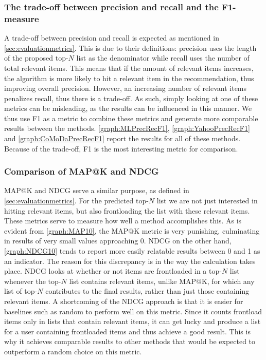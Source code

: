 \subsubsection{The trade-off between precision and recall and the F1-measure}\label{subsub:precrectradeoff}
A trade-off between precision and recall is expected as mentioned in \autoref{sec:evaluationmetrics}.
This is due to their definitions: precision uses the length of the proposed top-$N$ list as the denominator while recall uses the number of total relevant items.
This means that if the amount of relevant items increases, the algorithm is more likely to hit a relevant item in the recommendation, thus improving overall precision.
However, an increasing number of relevant items penalizes recall, thus there is a trade-off.
As such, simply looking at one of these metrics can be misleading, as the results can be influenced in this manner.
We thus use F1 as a metric to combine these metrics and generate more comparable results between the methods.
\autoref{graph:MLPrecRecF1}, \autoref{graph:YahooPrecRecF1} and \autoref{graph:CoMoDaPrecRecF1} report the results for all of these methods.
Because of the trade-off, F1 is the most interesting metric for comparison.


\subsubsection{Comparison of MAP@K and NDCG}
MAP@K and NDCG serve a similar purpose, as defined in \autoref{sec:evaluationmetrics}.
For the predicted top-$N$ list we are not just interested in hitting relevant items, but also frontloading the list with these relevant items.
These metrics serve to measure how well a method accomplishes this.
As is evident from \autoref{graph:MAP10}, the MAP@K metric is very punishing, culminating in results of very small values approaching 0.
NDCG on the other hand, \autoref{graph:NDCG10} tends to report more easily relatable results between 0 and 1 as an indicator.
The reason for this discrepancy is in the way the calculation takes place.
NDCG looks at whether or not items are frontloaded in a top-$N$ list whenever the top-$N$ list contains relevant items, unlike MAP@K, for which any list of top-$N$ contributes to the final results, rather than just those containing relevant items.
A shortcoming of the NDCG approach is that it is easier for baselines such as random to perform well on this metric.
Since it counts frontload items only in lists that contain relevant items, it can get lucky and produce a list for a user containing frontloaded items and thus achieve a good result.
This is why it achieves comparable results to other methods that would be expected to outperform a random choice on this metric.

